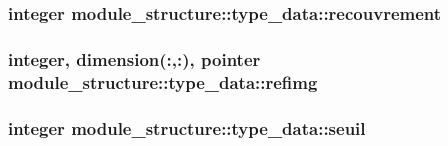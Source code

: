 \subsubsection[{recouvrement}]{\setlength{\rightskip}{0pt plus 5cm}integer module\+\_\+structure\+::type\+\_\+data\+::recouvrement}\label{structmodule__structure_1_1type__data_a48f072d67251fec80f72a58076491ca7}
\hypertarget{structmodule__structure_1_1type__data_acb77a7774d04786633bf0ef6482a5d00}{}
\subsubsection[{refimg}]{\setlength{\rightskip}{0pt plus 5cm}integer, dimension(\+:,\+:), pointer module\+\_\+structure\+::type\+\_\+data\+::refimg}\label{structmodule__structure_1_1type__data_acb77a7774d04786633bf0ef6482a5d00}
\hypertarget{structmodule__structure_1_1type__data_a3ee52c32703411f359fba32fc811dafb}{}
\subsubsection[{seuil}]{\setlength{\rightskip}{0pt plus 5cm}integer module\+\_\+structure\+::type\+\_\+data\+::seuil}\label{structmodule__structure_1_1type__data_a3ee52c32703411f359fba32fc811dafb}

